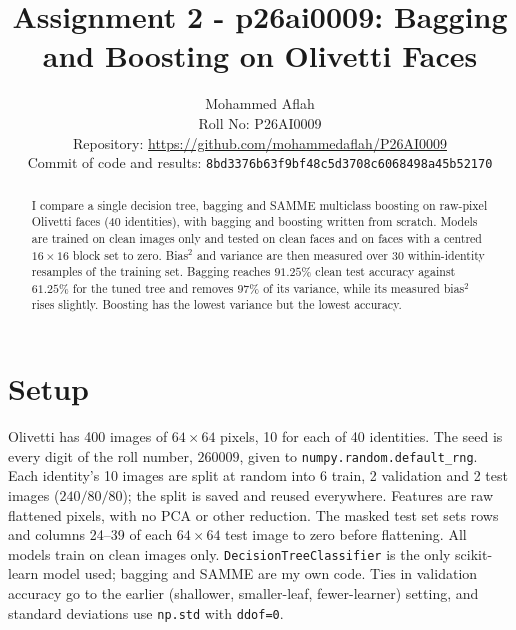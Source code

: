 \documentclass[10pt,twocolumn,letterpaper]{article}
\begin{document}
\title{Assignment 2 - p26ai0009: Bagging and Boosting on Olivetti Faces}

\author{Mohammed Aflah \\
Roll No: P26AI0009 \\
Repository: \url{https://github.com/mohammedaflah/P26AI0009} \\
Commit of code and results: \texttt{8bd3376b63f9bf48c5d3708c6068498a45b52170}}

\maketitle

\begin{abstract}
I compare a single decision tree, bagging and SAMME multiclass boosting on raw-pixel
Olivetti faces (40 identities), with bagging and boosting written from scratch.
Models are trained on clean images only and tested on clean faces and on faces with a
centred $16\times16$ block set to zero. Bias$^2$ and variance are then measured over 30
within-identity resamples of the training set.
Bagging reaches $91.25\%$ clean test accuracy against $61.25\%$ for the tuned tree and removes
$97\%$ of its variance, while its measured bias$^2$ rises slightly.
Boosting has the lowest variance but the lowest accuracy.
\end{abstract}

\section{Setup}
Olivetti has 400 images of $64\times64$ pixels, 10 for each of 40 identities.
The seed is every digit of the roll number, $260009$, given to \texttt{numpy.random.default\_rng}.
Each identity's 10 images are split at random into 6 train, 2 validation and 2 test images
($240/80/80$); the split is saved and reused everywhere.
Features are raw flattened pixels, with no PCA or other reduction.
The masked test set sets rows and columns 24--39 of each $64\times64$ test image to zero
before flattening. All models train on clean images only.
\texttt{DecisionTreeClassifier} is the only scikit-learn model used; bagging and SAMME are my own code.
Ties in validation accuracy go to the earlier (shallower, smaller-leaf, fewer-learner) setting, and
standard deviations use \texttt{np.std} with \texttt{ddof=0}.
\end{document}
